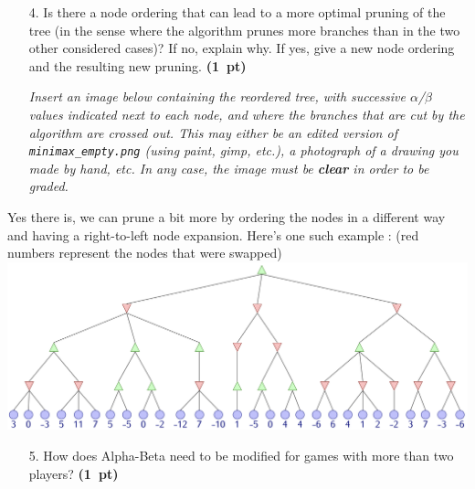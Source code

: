 \documentclass[11pt,a4paper]{report}
\begin{document}
\clearpage
\begin{enumerate}
    \item[4.] Is there a node ordering that can lead to a more optimal pruning of the tree
(in the sense where the algorithm prunes more branches than in the two other
considered cases)? If no, explain why. If yes, give a new node ordering and the
resulting new pruning.  \textbf{(1~pt)}
      
      \textit{Insert an image below containing the reordered tree, with successive $\alpha$/$\beta$ values indicated next to each node, and where the branches that are cut by the algorithm are crossed out. This may either be an edited version of \texttt{minimax\_empty.png} (using paint, gimp, etc.), a photograph of a drawing you made by hand, etc. In any case, the image must be \textbf{clear} in order to be graded.}
\end{enumerate}

\begin{answers}[8cm]
Yes there is, we can prune a bit more by ordering the nodes in a different way and having a right-to-left node expansion. Here's one such example : (red numbers represent the nodes that were swapped)
\includegraphics[scale=.29]{images/minimax.png}
\end{answers}




\begin{enumerate}
\item[5.] How does Alpha-Beta need to be modified for games with more than two players? \textbf{(1~pt)}
\end{enumerate}
\end{document}
